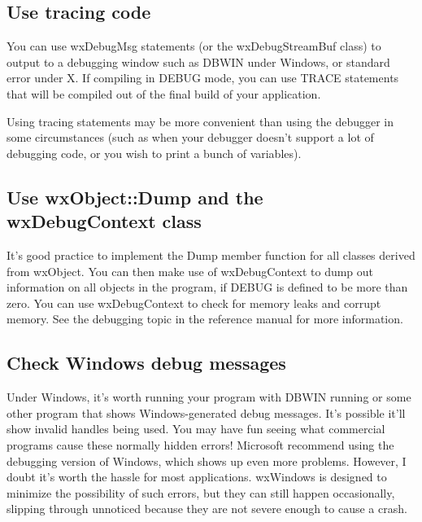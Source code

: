 \subsection{Use tracing code}

You can use wxDebugMsg statements (or the wxDebugStreamBuf class) to
output to a debugging window such as DBWIN under Windows, or standard
error under X. If compiling in DEBUG mode, you can use TRACE statements
that will be compiled out of the final build of your application.

Using tracing statements may be more convenient than using the debugger
in some circumstances (such as when your debugger doesn't support a lot
of debugging code, or you wish to print a bunch of variables).

\subsection{Use wxObject::Dump and the wxDebugContext class}

It's good practice to implement the Dump member function for all
classes derived from wxObject. You can then make use of wxDebugContext
to dump out information on all objects in the program, if DEBUG is
defined to be more than zero. You can use wxDebugContext to check for
memory leaks and corrupt memory. See the debugging topic in the
reference manual for more information.

\subsection{Check Windows debug messages}

Under Windows, it's worth running your program with DBWIN running or
some other program that shows Windows-generated debug messages. It's
possible it'll show invalid handles being used. You may have fun seeing
what commercial programs cause these normally hidden errors! Microsoft
recommend using the debugging version of Windows, which shows up even
more problems. However, I doubt it's worth the hassle for most
applications. wxWindows is designed to minimize the possibility of such
errors, but they can still happen occasionally, slipping through unnoticed
because they are not severe enough to cause a crash.
